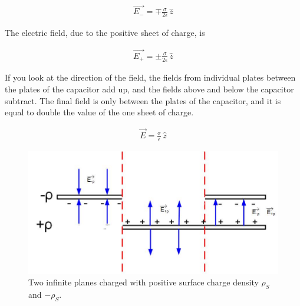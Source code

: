 \documentclass{ximera}
\begin{document}
\begin{eqnarray}
 \vec{E_-}  = \mp \frac{\sigma}{2 \epsilon } \, \hat{z}
\end{eqnarray}

The electric field, due to the positive sheet of charge, is


\begin{eqnarray}
 \vec{E_+}  = \pm \frac{\sigma}{2 \epsilon } \, \hat{z}
\end{eqnarray}

If you look at the direction of the field, the fields from individual plates between the plates of the capacitor add up, and the fields above and below the capacitor subtract. The final field is only between the plates of the capacitor, and it is equal to double the value of the one sheet of charge.




\begin{eqnarray}
 \vec{E}  = \frac{\sigma}{ \epsilon } \, \hat{z}
\end{eqnarray}


\begin{figure}[htbp]
\begin{center}
\includegraphics[scale=0.8]{../jpg/Infinite_Parallel_Plates1.jpg}
\end{center}
\caption{Two infinite planes charged with positive surface charge density $\rho_S$ and $-\rho_S.$}
\label{Gaus2Plane}
\end{figure}
\end{document}
